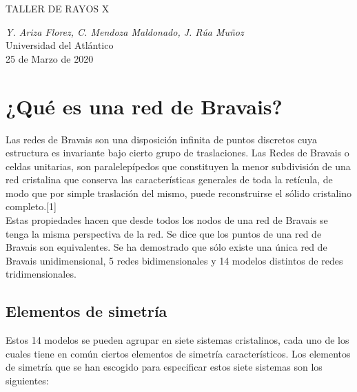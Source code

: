 \documentclass[12pt,a4paper]{article}
\begin{document}
\begin{titlepage}

\begin{center}
	\begin{large}
		TALLER DE RAYOS X
	\end{large}
	
	\vspace{0.2cm}
	
	\textit{Y. Ariza Florez, C. Mendoza Maldonado, J. Rúa Muñoz}\\ 
	Universidad del Atlántico\\
	25 de Marzo de 2020
\end{center}	
\end{titlepage}


	\vspace{0.5cm}
	\newpage
	
	\tableofcontents
	
	\newpage
\section{¿Qué es una red de Bravais?}
\vspace{0.2cm}

Las redes de Bravais son una disposición infinita de puntos discretos cuya estructura es invariante bajo cierto grupo de traslaciones. Las Redes de Bravais o celdas unitarias, son paralelepípedos que constituyen la menor subdivisión de una red cristalina que conserva las características generales de toda la retícula, de modo que por simple traslación del mismo, puede reconstruirse el sólido cristalino completo.[1]\\


\noindent Estas propiedades hacen que desde todos los nodos de una red de Bravais se tenga la misma perspectiva de la red. Se dice que los puntos de una red de Bravais son equivalentes. Se ha demostrado que sólo existe una única red de Bravais
unidimensional, 5 redes bidimensionales y 14 modelos distintos de redes
tridimensionales.\\

\subsection{Elementos de simetría}

\vspace{0.2cm}
\noindent Estos 14 modelos se pueden agrupar en siete sistemas cristalinos, cada uno de los cuales tiene en común ciertos elementos de simetría característicos. Los elementos de simetría que se han escogido para especificar estos siete sistemas son los siguientes:
\vspace{0.2cm}
\end{document}
